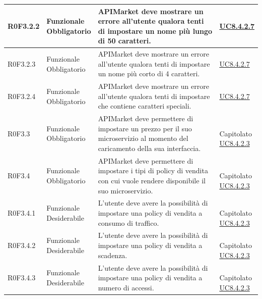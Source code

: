 \documentclass[12pt,a4paper,titlepage]{article}
\newcommand{\minitab}[2][1]{\begin{tabular}#1 #2\end{tabular}}
\newcommand{\uc}[1]{\hyperref[UC#1]{UC#1}}
\begin{document}
{\begin{longtable}{|m{5em}|m{6em}|m{28em}|m{5em}|}
			\hline
			R0F3.2.2 & \minitab[c]{Funzionale\\Obbligatorio} & APIMarket deve mostrare un errore all'utente qualora tenti di impostare un nome più lungo di 50 caratteri. & \uc{8.4.2.7}\\
			\hline 
			R0F3.2.3 & \minitab[c]{Funzionale\\Obbligatorio} & APIMarket deve mostrare un errore all'utente qualora tenti di impostare un nome più corto di 4 caratteri. & \uc{8.4.2.7}\\
			\hline 
			R0F3.2.4 & \minitab[c]{Funzionale\\Obbligatorio} & APIMarket deve mostrare un errore all'utente qualora tenti di impostare che contiene caratteri speciali. & \uc{8.4.2.7}\\
			\hline 
			R0F3.3 & \minitab[c]{Funzionale\\Obbligatorio} & APIMarket deve permettere di impostare un prezzo per il suo microservizio al momento del caricamento della sua interfaccia. & \shortstack[l]{\\Capitolato\\\uc{8.4.2.3}}\\
			\hline
			R0F3.4 & \minitab[c]{Funzionale\\Obbligatorio} & APIMarket deve permettere di impostare i tipi di policy di vendita con cui vuole rendere disponibile il suo microservizio. & \shortstack[l]{\\Capitolato\\\uc{8.4.2.3}}\\
			\hline
			R0F3.4.1 & \minitab[c]{Funzionale\\Desiderabile} & L'utente deve avere la possibilità di impostare una policy di vendita a consumo di traffico. & \shortstack[l]{\\Capitolato\\\uc{8.4.2.3}}\\
			\hline
			R0F3.4.2 & \minitab[c]{Funzionale\\Desiderabile} & L'utente deve avere la possibilità di impostare una policy di vendita a scadenza. &\shortstack[l]{\\Capitolato\\\uc{8.4.2.3}} \\
			\hline
			R0F3.4.3 & \minitab[c]{Funzionale\\Desiderabile} & L'utente deve avere la possibilità di impostare una policy di vendita a numero di accessi. & \shortstack[l]{\\Capitolato\\\uc{8.4.2.3}}\\

\end{longtable}}
\end{document}
